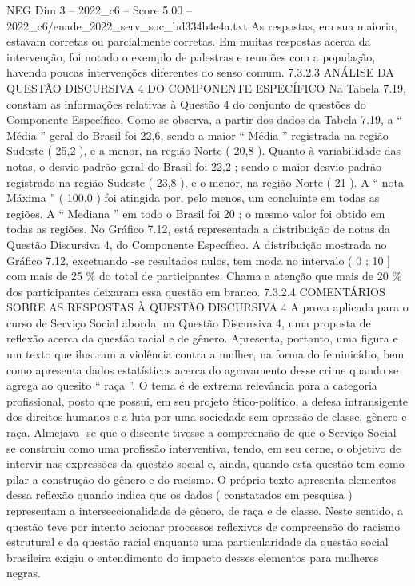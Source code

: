 \begin{textsample}{NEG Dim 3 – 2022\_c6 – Score 5.00 – 2022\_c6/enade\_2022\_serv\_soc\_bd334b4e4a.txt}
As respostas, em sua maioria, estavam corretas ou parcialmente corretas.
Em muitas respostas acerca da intervenção, foi notado o exemplo de palestras e reuniões com a população, havendo poucas intervenções diferentes do senso comum. 7.3.2.3 ANÁLISE DA QUESTÃO DISCURSIVA 4 DO COMPONENTE ESPECÍFICO Na Tabela 7.19, constam as informações relativas à Questão 4 do conjunto de questões do Componente Específico.
Como se observa, a partir dos dados da Tabela 7.19, a “ Média ” geral do Brasil foi 22,6, sendo a maior “ Média ” registrada na região Sudeste ( 25,2 ), e a menor, na região Norte ( 20,8 ).
Quanto à variabilidade das notas, o desvio-padrão geral do Brasil foi 22,2 ; sendo o maior desvio-padrão registrado na região Sudeste ( 23,8 ), e o menor, na região Norte ( 21 ).
A “ nota Máxima ” ( 100,0 ) foi atingida por, pelo menos, um concluinte em todas as regiões.
A “ Mediana ” em todo o Brasil foi 20 ; o mesmo valor foi obtido em todas as regiões.
No Gráfico 7.12, está representada a distribuição de notas da Questão Discursiva 4, do Componente Específico.
A distribuição mostrada no Gráfico 7.12, excetuando -se resultados nulos, tem moda no intervalo ( 0 ; 10 ] com mais de 25 \% do total de participantes.
Chama a atenção que mais de 20 \% dos participantes deixaram essa questão em branco. 7.3.2.4 COMENTÁRIOS SOBRE AS RESPOSTAS À QUESTÃO DISCURSIVA 4 A prova aplicada para o curso de Serviço Social aborda, na Questão Discursiva 4, uma proposta de reflexão acerca da questão racial e de gênero.
Apresenta, portanto, uma figura e um texto que ilustram a violência contra a mulher, na forma do feminicídio, bem como apresenta dados estatísticos acerca do agravamento desse crime quando se agrega ao quesito “ raça ”.
O tema é de extrema relevância para a categoria profissional, posto que possui, em seu projeto ético-político, a defesa intransigente dos direitos humanos e a luta por uma sociedade sem opressão de classe, gênero e raça.
Almejava -se que o discente tivesse a compreensão de que o Serviço Social se construiu como uma profissão interventiva, tendo, em seu cerne, o objetivo de intervir nas expressões da questão social e, ainda, quando esta questão tem como pilar a construção do gênero e do racismo.
O próprio texto apresenta elementos dessa reflexão quando indica que os dados ( constatados em pesquisa ) representam a interseccionalidade de gênero, de raça e de classe.
Neste sentido, a questão teve por intento acionar processos reflexivos de compreensão do racismo estrutural e da questão racial enquanto uma particularidade da questão social brasileira exigiu o entendimento do impacto desses elementos para mulheres negras.

\end{textsample}
